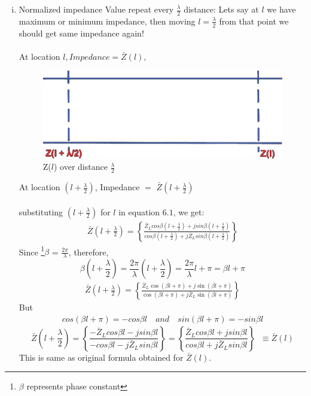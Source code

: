 \begin{enumerate}[(i)]
\item Normalized impedance Value repeat every $\frac{\lambda}{2}$ distance: Lets say at $l$ we have maximum or minimum impedance, then moving $l=\frac{\lambda}{2}$ from that point we should get same impedance again!\\\\
At location $l , Impedance =\bar{Z}(l),$
\begin{figure}[h]
\centering
\includegraphics[width=0.8\linewidth]{./graphics/6}
\caption{Z($l$) over distance $\frac{\lambda}{2}$}
\label{fig:astyuif}
\end{figure}

At location ${(l+\frac{\lambda}{2})}$, Impedance  $=$ $\bar{Z}(l+\frac{\lambda}{2})$\\\\
substituting ${(l+\frac{\lambda}{2})}$ for $l$ in equation $6.1$, we get: 
\begin{align*}
\bar{Z}(l+\frac{\lambda}{2}) = \left\lbrace \frac{\bar{Z}_L cos\beta (l+\frac{\lambda}{2}) + jsin\beta (l+\frac{\lambda}{2})}{cos\beta (l+\frac{\lambda}{2}) + j\bar{Z}_L sin\beta (l+\frac{\lambda}{2})}\right\rbrace 
\end{align*}
Since \footnote{$\beta$ represents phase constant}$\beta$ = $ \frac{2\pi}{\lambda}$, therefore,
\begin{dmath*}
\beta(l+\frac{\lambda}{2})=\frac{2\pi}{\lambda}(l+\frac{\lambda}{2})=\frac{2\pi}{\lambda}l+\pi=\beta l+\pi
\end{dmath*}
\begin{align*}
\bar{Z}(l+\frac{\lambda}{2}) = \left\lbrace \frac{\bar{Z}_L\cos(\beta l+\pi) + j\sin(\beta l+\pi)}{\cos(\beta l+\pi) + j\bar{Z}_L\sin(\beta l+\pi)}\right\rbrace 
\end{align*}
But 
\begin{align*} 
cos(\beta l+\pi)=-cos\beta l \quad and \quad sin(\beta l+\pi)=-sin\beta l
\end{align*}
\begin{dmath*}
\bar{Z}(l+\frac{\lambda}{2})=\left\lbrace \frac{-\bar{Z}_L cos\beta l - jsin\beta l}{-cos\beta l - j\bar{Z}_L sin\beta l}\right\rbrace = \left\lbrace \frac{\bar{Z}_L cos\beta l + jsin\beta l}{cos\beta l + j\bar{Z}_L sin\beta l}\right\rbrace\;\;\equiv \bar{Z}(l)
\end{dmath*} 
This is same as original formula obtained for $\bar{Z}(l)$.


\end{enumerate}

